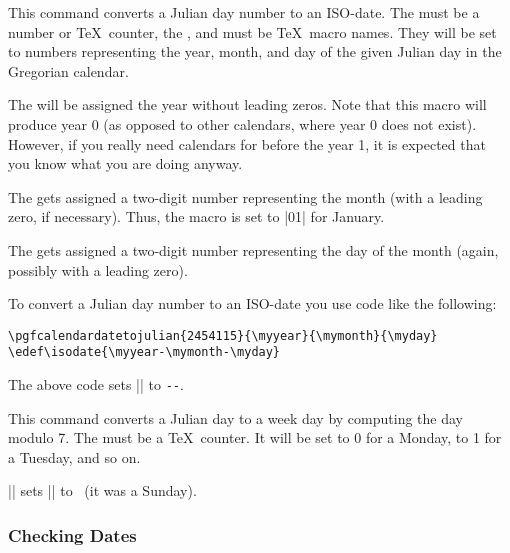 \begin{command}{\pgfcalendarjuliantodate{}}
  This command converts a Julian day number to an ISO-date. The
   must be a number or \TeX\ counter, the ,
   and  must be \TeX\ macro
  names. They will be set to numbers representing the year, month, and
  day of the given Julian day in the Gregorian calendar.

  The  will be assigned the year without leading
  zeros. Note that this macro will produce year 0 (as opposed to other
  calendars, where year 0 does not exist). However, if you really need
  calendars for before the year 1, it is expected that you know what
  you are doing anyway.

  The  gets assigned a two-digit number representing
  the month (with a leading zero, if necessary). Thus, the macro is
  set to |01| for January.

  The  gets assigned a two-digit number representing
  the day of the month (again, possibly with a leading zero).

  To convert a Julian day number to an ISO-date you use code like the
  following:
\begin{verbatim}
\pgfcalendardatetojulian{2454115}{\myyear}{\mymonth}{\myday}
\edef\isodate{\myyear-\mymonth-\myday}
\end{verbatim}
  The above code sets |\isodate| to
  \edef\isodate{\myyear-\mymonth-\myday}\texttt{\isodate}.
\end{command}


\begin{command}{\pgfcalendarjuliantoweekday{}}
  This command converts a Julian day to a week day by computing the
  day modulo 7. The  must be a \TeX\
  counter. It will be set to 0 for a Monday, to 1 for a Tuesday, and
  so on.

  \example || sets
  |\mycount| to
  \the\mycount\ (it was a Sunday).
\end{command}


\subsubsection{Checking Dates}


